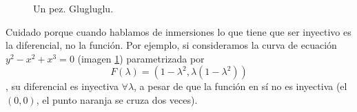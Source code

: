 \begin{example}

\begin{figure}[hbtp]
\centering
{}
\caption{Un pez. Glugluglu.}
\label{figPez}
\end{figure}

Cuidado porque cuando hablamos de inmersiones lo que tiene que ser inyectivo es la diferencial, no la función. Por ejemplo, si consideramos la curva de ecuación $y^2 - x^2 + x^3 = 0$ (imagen \ref{figPez}) parametrizada por \[ F(λ) = (1-λ^2, λ(1-λ^2)) \], su diferencial es inyectiva $∀λ$, a pesar de que la función en sí no es inyectiva (el $(0,0)$, el punto naranja se cruza dos veces).
\end{example}

